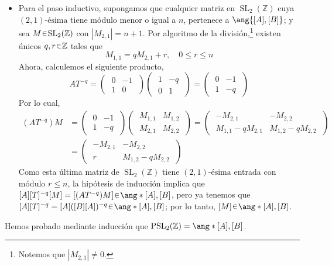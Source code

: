 \begin{sol}[Demostración]
\begin{itemize}
\item Para el paso inductivo, supongamos que cualquier matriz en $\operatorname{SL}_{2}(\mathbb{Z})$ cuya $(2,1)\text{-ésima}$ tiene módulo menor o igual a $n$, pertenece a $\ang{[A],[B]}$; y sea $M \en \operatorname{SL}_{2}(\mathbb{Z})$ con $|M_{2,1}| = n + 1$. Por algoritmo de la división,\footnote{Notemos que $|M_{2,1}| \neq 0$.} existen únicos $q,r \en \mathbb{Z}$ tales que 
\[
M_{1,1} = qM_{2,1} + r,%
\quad%
0 \leq r \leq n
\]
Ahora, calculemos el siguiente producto,
\[
AT^{-q} =%
\left(\;
    \begin{matrix}
    0 & -1 \\
    1 & 0
    \end{matrix}
\;\right)
\left(\;
    \begin{matrix}
    1 & -q \\
    0 & 1
    \end{matrix}
\;\right)%
=%
\left(\;
    \begin{matrix}
    0 & -1 \\
    1 & -q
    \end{matrix}
\;\right)
\]
Por lo cual,
\begin{align*}
(AT^{-q})M 
&=%
\left(\;
    \begin{matrix}
    0 & -1 \\
    1 & -q
    \end{matrix}
\;\right)
\left(\;
    \begin{matrix}
    M_{1,1} & M_{1,2} \\
    M_{2,1} & M_{2,2}
    \end{matrix}
\;\right)
=%
\left(\;
    \begin{matrix}
    -M_{2,1}           & -M_{2,2} \\
    M_{1,1} - qM_{2,1} & M_{1,2} - qM_{2,2}
    \end{matrix}
\;\right)\\
&=%
\left(\;
    \begin{matrix}
    -M_{2,1} & -M_{2,2} \\
    r        & M_{1,2} - qM_{2,2}
    \end{matrix}
\;\right)
\end{align*}
Como esta última matriz de $\operatorname{SL}_{2}(\mathbb{Z})$ tiene $(2,1)\text{-ésima}$ entrada con módulo $r \leq n$, la hipótesis de inducción implica que $[A][T]^{-q}[M] = [(AT^{-q})M] \en \ang*{[A],[B]}$, pero ya tenemos que $[A][T]^{-q} = [A]([B][A])^{-q} \en \ang*{[A], [B]}$; por lo tanto, $[M] \en \ang*{[A],[B]}$.
\end{itemize}
Hemos probado mediante inducción que $\operatorname{PSL}_{2}(\mathbb{Z}) = \ang*{[A], [B]}$.
\end{sol}\clearpage

